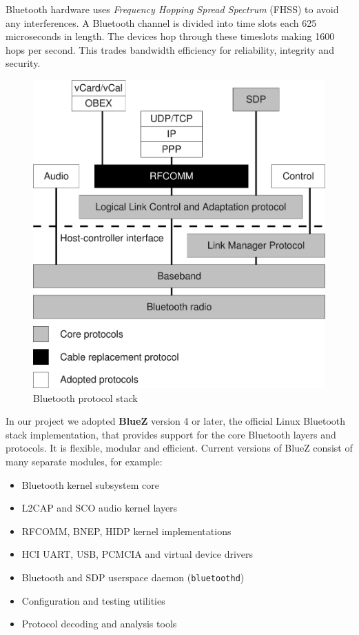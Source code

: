 \documentclass{IEEEtran}
\begin{document}
Bluetooth hardware uses \textit{Frequency Hopping Spread Spectrum} (FHSS) to avoid any interferences. A Bluetooth channel is divided into time slots each 625 microseconds in length. The devices hop through these timeslots making 1600 hops per second. This trades bandwidth efficiency for reliability, integrity and security.

\begin{figure}
\centering
\includegraphics[width=.9\columnwidth]{BTstack}
\caption{Bluetooth protocol stack}
\label{btstack}
\end{figure}

In our project we adopted \textbf{BlueZ} version 4 or later, the official Linux Bluetooth stack implementation, that provides support for the core Bluetooth layers and protocols. It is flexible, modular and efficient. Current versions of BlueZ consist of many separate modules, for example:
\begin{itemize}
\item Bluetooth kernel subsystem core
\item L2CAP and SCO audio kernel layers
\item RFCOMM, BNEP, HIDP kernel implementations
\item HCI UART, USB, PCMCIA and virtual device drivers
\item Bluetooth and SDP userspace daemon (\texttt{bluetoothd})
\item Configuration and testing utilities
\item Protocol decoding and analysis tools
\end{itemize}
\end{document}
